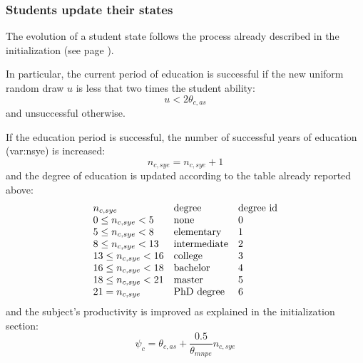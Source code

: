 \documentclass{book}
\begin{document}



\subsubsection{Students update their states}

The evolution of a student state follows the process already described in the initialization (see page \pageref{pref:tudentevolution}).

In particular, the current period of education is successful if the new uniform random draw $u$ is less that two times the student ability:
\[
	u<2\theta_{c,as}
\]
and unsuccessful otherwise.

If the education period is successful, the number of successful years of education (\gls{var:nsye}) is increased:
\[
n_{c,sye}=n_{c,sye}+1
\]
and the degree of education is updated according to the table already reported above:
\[
	\begin{array}{l l l}
		n_{c,sye}& \textnormal{degree}& \textnormal{degree id}\\
	0\le n_{c,sye}<5 & \textnormal{none}&0\\
	5\le n_{c,sye}<8 & \textnormal{elementary}&1\\
	8\le n_{c,sye}<13 & \textnormal{intermediate}&2\\
	13\le n_{c,sye}<16 & \textnormal{college}&3\\
	16\le n_{c,sye}<18 & \textnormal{bachelor}&4\\
	18\le n_{c,sye}<21 & \textnormal{master}&5\\
	21= n_{c,sye} & \textnormal{PhD degree}&6
	\end{array}
\]
and the subject's productivity is improved as explained in the initialization section: 
\[
	\psi_c=\theta_{c,as}+\frac{0.5}{\theta_{mnpe}}n_{c,sye}
\]
\end{document}
